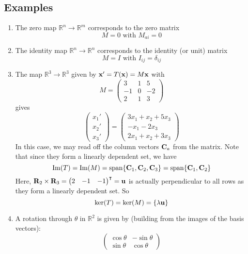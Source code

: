 \subsection{Examples}
\begin{enumerate}
	\item The zero map \(\mathbb R^n \to \mathbb R^m\) corresponds to the zero matrix
	      \[
		      M = 0 \text{ with } M_{ai} = 0
	      \]
	\item The identity map \(\mathbb R^n \to \mathbb R^n\) corresponds to the identity (or unit) matrix
	      \[
		      M = I \text{ with } I_{ij} = \delta_{ij}
	      \]
	\item The map \(\mathbb R^3 \to \mathbb R^3\) given by \(\vb x' = T(\vb x) = M\vb x\) with
	      \[
		      M = \begin{pmatrix}
			      3  & 1 & 5  \\
			      -1 & 0 & -2 \\
			      2  & 1 & 3
		      \end{pmatrix}
	      \]
	      gives
	      \[
		      \begin{pmatrix}
			      x_1' \\ x_2' \\ x_3'
		      \end{pmatrix}
		      =
		      \begin{pmatrix}
			      3x_1 + x_2 + 5x_3 \\
			      -x_1 - 2x_3       \\
			      2x_1 + x_2 + 3x_3
		      \end{pmatrix}
	      \]
	      In this case, we may read off the column vectors \(\vb C_a\) from the matrix.
	      Note that since they form a linearly dependent set, we have
	      \[
		      \Im(T) = \Im(M) = \operatorname{span} \{ \vb C_1, \vb C_2, \vb C_3 \} = \operatorname{span} \{ \vb C_1, \vb C_2 \}
	      \]
	      Here, \(\vb R_2 \times \vb R_3 = \begin{pmatrix}
		      2 & -1 & -1
	      \end{pmatrix}^\intercal = \vb u\) is actually perpendicular to all rows as they form a linearly dependent set.
	      So
	      \[
		      \ker(T) = \ker(M) = \{ \lambda \vb u \}
	      \]
	\item A rotation through \(\theta\) in \(\mathbb R^2\) is given by (building from the images of the basis vectors):
	      \[
		      \begin{pmatrix}
			      \cos \theta & -\sin \theta \\
			      \sin \theta & \cos \theta

\end{pmatrix}\]
\end{enumerate}
